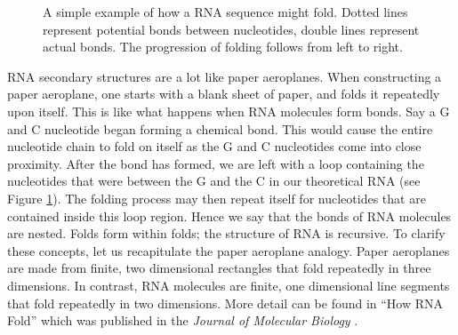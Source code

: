 \documentclass{cshonours}
\begin{document}
\begin{figure}
\begin{center}
\end{center}
\caption{A simple example of how a RNA sequence might fold. Dotted lines represent potential bonds between nucleotides, double lines represent actual bonds. The progression of folding follows from left to right.}
\label{fig:RNAssBasic}
\end{figure}


RNA secondary structures are a lot like paper aeroplanes. When constructing a paper aeroplane, one starts with a blank sheet of paper, and folds it repeatedly upon itself. This is like what happens when RNA molecules form bonds. Say a G and C nucleotide began forming a chemical bond. This would cause the entire nucleotide chain to fold on itself as the G and C nucleotides come into close proximity. After the bond has formed, we are left with a loop containing the nucleotides that were between the G and the C in our theoretical RNA (see Figure \ref{fig:RNAssBasic}). The folding process may then repeat itself for nucleotides that are contained inside this loop region. Hence we say that the bonds of RNA molecules are nested. Folds form within folds; the structure of RNA is recursive. To clarify these concepts, let us recapitulate the paper aeroplane analogy. Paper aeroplanes are made from finite, two dimensional rectangles that fold repeatedly in three dimensions. In contrast, RNA molecules are finite, one dimensional line segments that fold repeatedly in two dimensions. More detail can be found in ``How RNA Fold'' which was published in the \emph{Journal of Molecular Biology} \cite{tinoco1999rna}.
\end{document}
